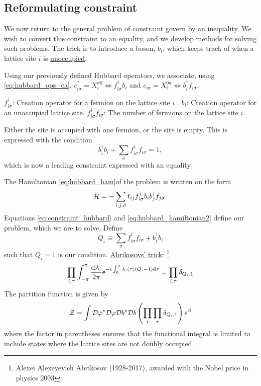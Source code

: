 \subsection{Reformulating constraint}
We now return to the general problem of constraint govern by an inequality. We wish to convert this constraint to an equality, and we develop methods for solving such problems. The trick is to introduce a boson, $b_i$, which keeps track of when a lattice site $i$ is \underline{unoccupied}.

Using our previously defined Hubbard operators, we associate, using \eqref{eq:hubbard_ops_ca}, \(c_{i\sigma}^\dagger = X_i^{\sigma 0} \Leftrightarrow f_{i\sigma}^\dagger b_i\) and \(c_{i\sigma} = X_i^{0\sigma} \Leftrightarrow  b_i^\dagger f_{i\sigma}\). 

$f_{i\sigma}^\dagger$: Creation operator for a fermion on the lattice site $i$ .
$b_i$: Creation operator for an unoccupied lattice site. 
$f_{i\sigma}^\dagger f_{i\sigma}$: The number of fermions on the lattice site $i$. 

Either the site is occupied with one fermion, or the site is empty. This is expressed with the condition 
\begin{equation}
\label{eq:constraint_hubbard}
b_i^\dagger b_i + \sum_\sigma f_{i\sigma}^\dagger f_{i\sigma} = 1,
\end{equation}
which is now a leading constraint expressed with an equality. 

The Hamiltonian \eqref{eq:hubbard_ham}of the problem is written on the form 
\begin{equation}
\label{eq:hubbard_hamiltonian2}
\mathcal{H} = -\sum_{i,j,\sigma}t_{ij}f_{i\sigma}^\dagger b_i b_j^\dagger f_{j\sigma}.
\end{equation}
Equations \eqref{eq:constraint_hubbard} and \eqref{eq:hubbard_hamiltonian2} define our problem, which we are to solve. Define
\begin{equation}
Q_i \equiv   \sum_\sigma f_{i\sigma}^\dagger f_{i\sigma} + b_i^\dagger b_i
\end{equation}
such that $Q_i = 1$ is our condition. 
\underline{Abrikosovs' trick}: \footnote{Alexei Alexeyevich Abrikosov (1928-2017), awarded with the Nobel price in physics 2003}
\begin{equation}
\prod_{i,\tau}\int_{-\pi}^\pi \frac{\dd{\lambda_i}}{2\pi}\mathrm{e}^{-i\int_0^\beta\lambda_i(\tau)(Q_i -1)\dd{\tau}} = \prod_{i,\tau}\delta_{Q_i,1}
\end{equation}
The partition function is given by 
\begin{equation}
\mathcal{Z}  = \int \mathcal{D}\varphi^*\mathcal{D}\varphi\mathcal{D} b^*\mathcal{D} b \left(\prod_i\prod_\tau\delta_{Q_i,1}\right)\mathrm{e}^{\mathcal{S}}
\end{equation}
where the factor in parentheses ensures that the functional integral is limited to include states where the lattice sites are \underline{not} doubly occupied.

